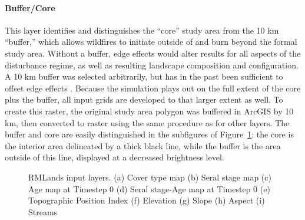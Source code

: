 \paragraph{Buffer/Core} 
This layer identifies and distinguishes the ``core'' study area from the 10 km ``buffer,'' which allows wildfires to initiate outside of and burn beyond the formal study area. Without a buffer, edge effects would alter results for all aspects of the disturbance regime, as well as resulting landscape composition and configuration. A 10 km buffer was selected arbitrarily, but has in the past been sufficient to offset edge effects \citep{McGarigal2005,McGarigal2005a}. Because the simulation plays out on the full extent of the core plus the buffer, all input grids are developed to that larger extent as well. To create this raster, the original study area polygon was buffered in ArcGIS by 10 km, then converted to raster using the same procedure as for other layers. The buffer and core are easily distinguished in the subfigures of Figure~\ref{fig:inputlayermaps}: the core is the interior area delineated by a thick black line, while the buffer is the area outside of this line, displayed at a decreased brightness level.


\begin{figure}[!htbp]
  \centering
   \qquad
	 \qquad
   \qquad
	 \qquad

  \caption{RMLands input layers. (a) Cover type map (b) Seral stage map (c) Age map at Timestep 0 (d) Seral stage-Age map at Timestep 0 (e) Topographic Position Index (f) Elevation (g) Slope (h) Aspect (i) Streams}
  \label{fig:inputlayermaps}
\end{figure}


